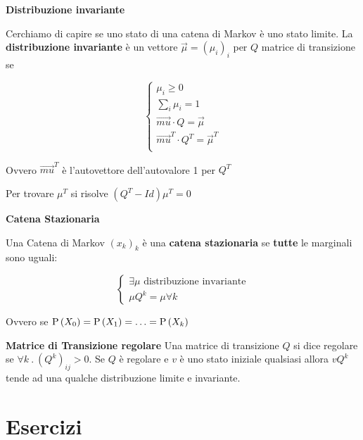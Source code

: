 \begin{defn}
	\textbf{Distribuzione invariante}
	
	Cerchiamo di capire se uno stato di una catena di Markov \`e uno stato limite. La \textbf{distribuzione invariante} \`e un vettore $ \vec{\mu} = (\mu_i)_i $ per $ Q $ matrice di transizione se 
	
	\begin{equation*}
	\begin{cases}
	\mu_i \geq 0 \\
	\sum_i \mu_i = 1 \\
	\vec{mu} \cdot Q = \vec{\mu} \\
	\vec{mu}^T \cdot Q^T = \vec{\mu}^T \\
	\end{cases}
	\end{equation*}
	
	Ovvero $ \vec{mu}^T $ \`e l'autovettore dell'autovalore 1 per $ Q^T $
	
	Per trovare $ \mu^T $ si risolve $(Q^T-Id)\mu^T = 0$
\end{defn}

\begin{defn}
	\textbf{Catena Stazionaria}
	
	Una Catena di Markov $ (x_k)_k $ \`e una \textbf{catena stazionaria} se \textbf{tutte} le marginali sono uguali:
	
	\[ \begin{cases}
	\exists \mu \text{ distribuzione invariante} \\
	\mu Q^k = \mu \forall k 
	\end{cases} \]
	
	Ovvero se $ \text{P}\left(X_0\right) = \text{P}\left(X_1\right) = \hdots = \text{P}\left(X_k\right) $
\end{defn}

\begin{defn}
	\textbf{Matrice di Transizione regolare}
	Una matrice di transizione $ Q $ si dice regolare se $ \forall k \>.\> (Q^k)_{ij} > 0 $. Se $ Q $ \`e regolare e $ v $ \`e uno stato iniziale qualsiasi allora $ vQ^k $ tende ad una qualche distribuzione limite e invariante.
\end{defn}


\section{Esercizi}

